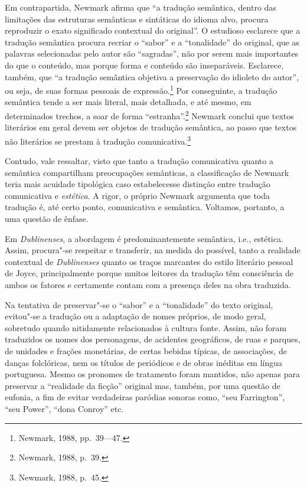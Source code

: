 Em contrapartida, Newmark afirma que “a tradução semântica, dentro das
limitações das estruturas semânticas e sintáticas do idioma alvo, procura
reproduzir o exato significado contextual do original”. O estudioso esclarece
que a tradução semântica procura recriar o “sabor” e a “tonalidade” do
original, que as palavras selecionadas pelo autor são “sagradas”, não por serem
mais importantes do que o conteúdo, mas porque forma e conteúdo são
inseparáveis. Esclarece, também, que “a tradução semântica objetiva a
preservação do idioleto do autor”, ou seja, de suas formas pessoais de
expressão.\footnote{ Newmark, 1988, pp.~39---47.} Por conseguinte, a tradução semântica
tende a ser mais literal, mais detalhada, e até mesmo, em determinados trechos,
a soar de forma “estranha”.\footnote{ Newmark, 1988, p.~39.} Newmark conclui que textos literários
em geral devem ser objetos de tradução semântica, ao passo que textos não
literários se prestam à tradução comunicativa.\footnote{ Newmark, 1988, p.~45.}

Contudo, vale ressaltar, visto que tanto a tradução comunicativa quanto a
semântica compartilham preocupações semânticas, a classificação de Newmark
teria mais acuidade tipológica caso estabelecesse distinção entre tradução
comunicativa e \textit{estética}.  A rigor, o próprio Newmark argumenta que
toda tradução é, até certo ponto, comunicativa e semântica. Voltamos, portanto,
a uma questão de ênfase.

Em \textit{Dublinenses}, a abordagem é predominantemente semântica, i.e.,
estética. Assim, procura"-se respeitar e transferir, na medida do possível,
tanto a realidade contextual de \textit{Dublinenses} quanto os traços marcantes
do estilo literário pessoal de Joyce, principalmente porque muitos leitores da
tradução têm consciência de ambos os fatores e certamente contam com a presença
deles na obra traduzida.

Na tentativa de preservar"-se o “sabor” e a “tonalidade” do texto original,
evitou"-se a tradução ou a adaptação de nomes próprios, de modo geral, sobretudo
quando nitidamente relacionados à cultura fonte. Assim, não foram traduzidos os
nomes dos personagens, de acidentes geográficos, de ruas e parques, de unidades
e frações monetárias, de certas bebidas típicas, de associações, de danças
folclóricas, nem os títulos de periódicos e de obras inéditas em língua
portuguesa. Mesmo os pronomes de tratamento foram mantidos, não apenas para
preservar a “realidade da ficção” original mas, também, por uma questão de
eufonia, a fim de evitar verdadeiras paródias sonoras como, “seu Farrington”,
“seu Power”, “dona Conroy” etc.

